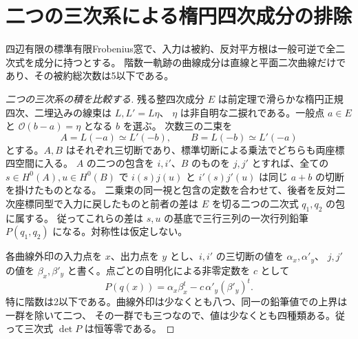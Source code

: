 \section{二つの三次系による楕円四次成分の排除}
\label{sec:rank-one-elliptic-quartic-exclusion}
\begin{theorem}\label{thm:rank-one-elliptic-quartic-exclusion}
四辺有限の標準有限Frobenius窓で、入力は被約、反対平方根は一般可逆で全二次式を成分に持つとする。
階数一軌跡の曲線成分は直線と平面二次曲線だけであり、その被約総次数は5以下である。
\end{theorem}
\begin{proof}[二つの三次系の積を比較する]
残る整四次成分 $E$ は前定理で滑らかな楕円正規四次、二埋込みの線束は $L,L'=L\eta$、
$\eta$ は非自明な二捩れである。一般点 $a\in E$ と $\mathcal O(b-a)=\eta$ となる $b$ を選ぶ。
次数三の二束を
\[
 A=L(-a)\simeq L'(-b),\qquad B=L(-b)\simeq L'(-a)
\]
とする。$A,B$ はそれぞれ三切断であり、標準切断による乗法でどちらも両座標四空間に入る。
$A$ の二つの包含を $i,i'$、$B$ のものを $j,j'$ とすれば、全ての $s\in H^0(A),u\in H^0(B)$ で
$i(s)j(u)$ と $i'(s)j'(u)$ は同じ $a+b$ の切断を掛けたものとなる。
二乗束の同一視と包含の定数を合わせて、後者を反対二次座標同型で入力に戻したものと前者の差は
$E$ を切る二つの二次式 $q_1,q_2$ の包に属する。
従ってこれらの差は $s,u$ の基底で三行三列の一次行列鉛筆 $P(q_1,q_2)$ になる。対称性は仮定しない。

各曲線外印の入力点を $x$、出力点を $y$ とし、$i,i'$ の三切断の値を $\alpha_x,\alpha'_y$、
$j,j'$ の値を $\beta_x,\beta'_y$ と書く。点ごとの自明化による非零定数を $c$ として
\[
          P(q(x))=\alpha_x\beta_x^t-c\,\alpha'_y(\beta'_y)^t .
\]
特に階数は2以下である。曲線外印は少なくとも八つ、同一の鉛筆値での上界は一群を除いて二つ、
その一群でも三つなので、値は少なくとも四種類ある。従って三次式 $\det P$ は恒等零である。
\end{proof}
